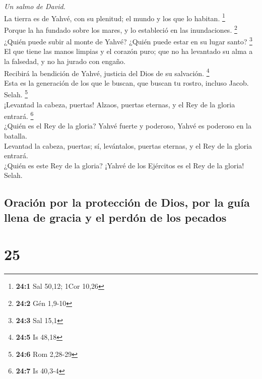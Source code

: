 \emph{Un salmo de David.}\\
 La tierra es de Yahvé, con su plenitud; el mundo y los
que lo habitan. \footnote{\textbf{24:1} Sal 50,12; 1Cor 10,26}\\
 Porque la ha fundado sobre los mares, y lo estableció en
las inundaciones. \footnote{\textbf{24:2} Gén 1,9-10}\\
 ¿Quién puede subir al monte de Yahvé? ¿Quién puede estar
en su lugar santo? \footnote{\textbf{24:3} Sal 15,1}\\
 El que tiene las manos limpias y el corazón puro; que no
ha levantado su alma a la falsedad, y no ha jurado con engaño.\\
 Recibirá la bendición de Yahvé, justicia del Dios de su
salvación. \footnote{\textbf{24:5} Is 48,18}\\
 Esta es la generación de los que le buscan, que buscan tu
rostro, incluso Jacob. Selah. \footnote{\textbf{24:6} Rom 2,28-29}\\
 ¡Levantad la cabeza, puertas! Alzaos, puertas eternas, y
el Rey de la gloria entrará. \footnote{\textbf{24:7} Is 40,3-4}\\
 ¿Quién es el Rey de la gloria? Yahvé fuerte y poderoso,
Yahvé es poderoso en la batalla.\\
 Levantad la cabeza, puertas; sí, levántalos, puertas
eternas, y el Rey de la gloria entrará.\\
 ¿Quién es este Rey de la gloria? ¡Yahvé de los Ejércitos
es el Rey de la gloria! Selah.

\hypertarget{oraciuxf3n-por-la-protecciuxf3n-de-dios-por-la-guuxeda-llena-de-gracia-y-el-perduxf3n-de-los-pecados}{%
\subsection{Oración por la protección de Dios, por la guía llena de
gracia y el perdón de los
pecados}\label{oraciuxf3n-por-la-protecciuxf3n-de-dios-por-la-guuxeda-llena-de-gracia-y-el-perduxf3n-de-los-pecados}}

\hypertarget{section-24}{%
\section{25}\label{section-24}}

